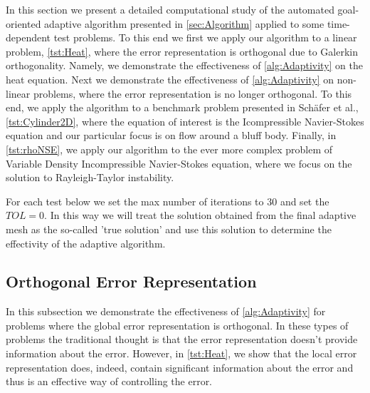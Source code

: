 In this section we present a detailed computational study of the automated
goal-oriented adaptive algorithm presented in \autoref{sec:Algorithm} applied to
some time-dependent test problems. To this end we first we apply our algorithm
to a linear problem, \autoref{tst:Heat}, where the error representation is
orthogonal due to Galerkin orthogonality. Namely, we demonstrate the
effectiveness of \autoref{alg:Adaptivity} on the heat equation. Next we
demonstrate the effectiveness of \autoref{alg:Adaptivity} on non-linear
problems, where the error representation is no longer orthogonal. To this end,
we apply the algorithm to a benchmark problem presented in Sch\"afer et
al.\cite{Schaefer1996}, \autoref{tst:Cylinder2D}, where the equation of interest
is the Icompressible Navier-Stokes equation and our particular focus is on flow
around a bluff body.  Finally, in \autoref{tst:rhoNSE}, we apply our algorithm
to the ever more complex problem of Variable Density Incompressible
Navier-Stokes equation, where we focus on the solution to Rayleigh-Taylor
instability.

For each test below we set the max number of iterations to $30$ and set the
$TOL=0$. In this way we will treat the solution obtained from the final adaptive
mesh as the so-called 'true solution' and use this solution to determine the
effectivity of the adaptive algorithm.

\subsection{Orthogonal Error Representation}

In this subsection we demonstrate the effectiveness of \autoref{alg:Adaptivity}
for problems where the global error representation is orthogonal. In these types
of problems the traditional thought is that the error representation doesn't
provide information about the error. However, in \autoref{tst:Heat}, we show
that the local error representation does, indeed, contain significant
information about the error and thus is an effective way of controlling the
error.

